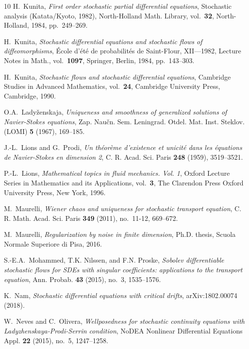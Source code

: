 \documentclass[a4paper,10pt]{article}
\newcommand\1{\mathbbm{1}}
\numberwithin{equation}{section}
\begin{document}
\begin{thebibliography}{10}
H.~Kunita, \emph{First order stochastic partial differential equations},
  Stochastic analysis ({K}atata/{K}yoto, 1982), North-Holland Math. Library,
  vol.~\textbf{32}, North-Holland, 1984, pp.~249--269.

H.~Kunita, \emph{Stochastic differential equations and stochastic flows of
  diffeomorphisms}, \'{E}cole d'\'et\'e de probabilit\'es de {S}aint-{F}lour, {XII}---1982, Lecture Notes in Math., vol.~\textbf{1097}, Springer, Berlin, 1984, pp.~143--303.

H.~Kunita, \emph{Stochastic flows and stochastic differential equations},
  Cambridge Studies in Advanced Mathematics, vol.~\textbf{24}, Cambridge University
  Press, Cambridge, 1990.

O.A.~Lady{\v{z}}enskaja, \emph{Uniqueness and smoothness of generalized
  solutions of {N}avier-{S}tokes equations}, Zap. Nau\v cn. Sem. Leningrad.
  Otdel. Mat. Inst. Steklov. (LOMI) \textbf{5} (1967), 169--185.

J.-L.~Lions and G.~Prodi, \emph{Un th\'eor\`eme d'existence et unicit\'e dans les \'equations de {N}avier-{S}tokes en dimension 2}, C. R. Acad. Sci. Paris \textbf{248} (1959), 3519--3521.

P.-L.~Lions, \emph{Mathematical topics in fluid mechanics. {V}ol. 1}, Oxford
  Lecture Series in Mathematics and its Applications, vol.~\textbf{3}, The
  Clarendon Press Oxford University Press, New York, 1996.

M.~Maurelli, \emph{Wiener chaos and uniqueness for stochastic transport
  equation}, C. R. Math. Acad. Sci. Paris \textbf{349} (2011), no.~11-12,
  669--672.

M.~Maurelli, \emph{Regularization by noise in finite dimension}, Ph.D. thesis, Scuola Normale Superiore di Pisa, 2016.

S.-E.A.~Mohammed, T.K. Nilssen, and F.N. Proske, \emph{Sobolev differentiable stochastic flows for {SDE}s with singular coefficients: applications to the transport equation}, Ann. Probab. \textbf{43} (2015), no.~3, 1535--1576.

K.~Nam, \emph{Stochastic differential equations with critical drifts},
  arXiv:1802.00074 (2018).

W.~Neves and C.~Olivera, \emph{Wellposedness for stochastic continuity equations with {L}adyzhenskaya-{P}rodi-{S}errin condition}, NoDEA Nonlinear Differential Equations Appl. \textbf{22} (2015), no.~5, 1247--1258.


\end{thebibliography}
\end{document}
